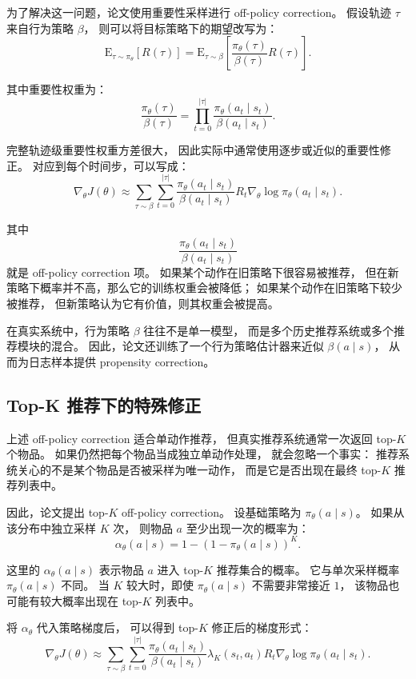 \documentclass[11pt]{ctexart}
\begin{document}
为了解决这一问题，论文使用重要性采样进行 off-policy correction。
假设轨迹 $\tau$ 来自行为策略 $\beta$，
则可以将目标策略下的期望改写为：
\[
\mathrm{E}_{\tau\sim \pi_{\theta}}
\left[
R(\tau)
\right]
=
\mathrm{E}_{\tau\sim \beta}
\left[
\frac{\pi_{\theta}(\tau)}{\beta(\tau)}
R(\tau)
\right].
\]

其中重要性权重为：
\[
\frac{\pi_{\theta}(\tau)}{\beta(\tau)}
=
\prod_{t=0}^{|\tau|}
\frac{
\pi_{\theta}(a_t\mid s_t)
}{
\beta(a_t\mid s_t)
}.
\]

完整轨迹级重要性权重方差很大，
因此实际中通常使用逐步或近似的重要性修正。
对应到每个时间步，可以写成：
\[
\nabla_{\theta}J(\theta)
\approx
\sum_{\tau\sim \beta}
\sum_{t=0}^{|\tau|}
\frac{
\pi_{\theta}(a_t\mid s_t)
}{
\beta(a_t\mid s_t)
}
R_t
\nabla_{\theta}
\log \pi_{\theta}(a_t\mid s_t).
\]

其中
\[
\frac{
\pi_{\theta}(a_t\mid s_t)
}{
\beta(a_t\mid s_t)
}
\]
就是 off-policy correction 项。
如果某个动作在旧策略下很容易被推荐，
但在新策略下概率并不高，那么它的训练权重会被降低；
如果某个动作在旧策略下较少被推荐，
但新策略认为它有价值，则其权重会被提高。

在真实系统中，行为策略 $\beta$ 往往不是单一模型，
而是多个历史推荐系统或多个推荐模块的混合。
因此，论文还训练了一个行为策略估计器来近似 $\beta(a\mid s)$，
从而为日志样本提供 propensity correction。

\subsection{Top-K 推荐下的特殊修正}

上述 off-policy correction 适合单动作推荐，
但真实推荐系统通常一次返回 top-$K$ 个物品。
如果仍然把每个物品当成独立单动作处理，
就会忽略一个事实：
推荐系统关心的不是某个物品是否被采样为唯一动作，
而是它是否出现在最终 top-$K$ 推荐列表中。

因此，论文提出 top-$K$ off-policy correction。
设基础策略为 $\pi_{\theta}(a\mid s)$。
如果从该分布中独立采样 $K$ 次，
则物品 $a$ 至少出现一次的概率为：
\[
\alpha_{\theta}(a\mid s)
=
1-
\left(
1-\pi_{\theta}(a\mid s)
\right)^K.
\]

这里的 $\alpha_{\theta}(a\mid s)$ 表示物品 $a$ 进入 top-$K$ 推荐集合的概率。
它与单次采样概率 $\pi_{\theta}(a\mid s)$ 不同。
当 $K$ 较大时，即使 $\pi_{\theta}(a\mid s)$ 不需要非常接近 $1$，
该物品也可能有较大概率出现在 top-$K$ 列表中。

将 $\alpha_{\theta}$ 代入策略梯度后，
可以得到 top-$K$ 修正后的梯度形式：
\[
\nabla_{\theta}J(\theta)
\approx
\sum_{\tau\sim \beta}
\sum_{t=0}^{|\tau|}
\frac{
\pi_{\theta}(a_t\mid s_t)
}{
\beta(a_t\mid s_t)
}
\lambda_K(s_t,a_t)
R_t
\nabla_{\theta}
\log \pi_{\theta}(a_t\mid s_t).
\]
\end{document}
